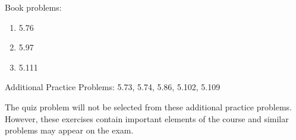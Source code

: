 
Book problems:
\begin{enumerate}
  \item 5.76
  \item 5.97
  \item 5.111
\end{enumerate}

Additional Practice Problems: 5.73, 5.74, 5.86, 5.102, 5.109
  
\noindent The quiz problem will not be selected from these additional practice problems.  However, these exercises contain important elements of the course and similar problems may appear on the exam.

\iftoggle{flagSoln}{%
\vspace{.5cm}
\rule{\textwidth}{.4pt}
\vspace{.5cm}
\textbf{Solution:}
\begin{enumerate}
  \item[5.76]  B = 150.0 lb up, C = 5250 lb up
  \item[5.97] $21h/16$ above the vertex of the cone.
  \item[5.111] $\bar{X} = 17.00 in$, $\bar{Y} = 15.68 in$, $\bar{Z} = 14.16 in$
\end{enumerate}
}{%
}%
